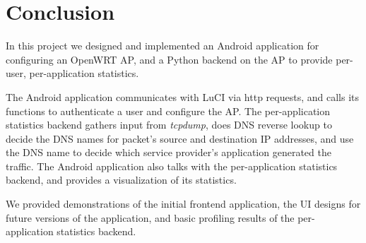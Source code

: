 \section{Conclusion}

In this project we designed and implemented an Android application for configuring an OpenWRT AP, and a Python backend on the AP to provide per-user, per-application statistics.

The Android application communicates with LuCI via http requests, and calls its functions to authenticate a user and configure the AP. The per-application statistics backend gathers input from \textit{tcpdump}, does DNS reverse lookup to decide the DNS names for packet's source and destination IP addresses, and use the DNS name to decide which service provider's application generated the traffic. The Android application also talks with the per-application statistics backend, and provides a visualization of its statistics.

We provided demonstrations of the initial frontend application, the UI designs for future versions of the application, and basic profiling results of the per-application statistics backend.